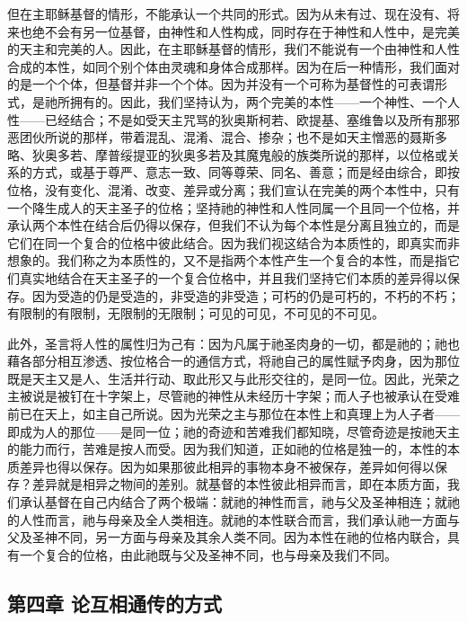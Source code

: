 但在主耶稣基督的情形，不能承认一个共同的形式。因为从未有过、现在没有、将来也绝不会有另一位基督，由神性和人性构成，同时存在于神性和人性中，是完美的天主和完美的人。因此，在主耶稣基督的情形，我们不能说有一个由神性和人性合成的本性，如同个别个体由灵魂和身体合成那样。因为在后一种情形，我们面对的是一个个体，但基督并非一个个体。因为并没有一个可称为基督性的可表谓形式，是祂所拥有的。因此，我们坚持认为，两个完美的本性——一个神性、一个人性——已经结合；不是如受天主咒骂的狄奥斯柯若、欧提基、塞维鲁以及所有那邪恶团伙所说的那样，带着混乱、混淆、混合、掺杂；也不是如天主憎恶的聂斯多略、狄奥多若、摩普绥提亚的狄奥多若及其魔鬼般的族类所说的那样，以位格或关系的方式，或基于尊严、意志一致、同等尊荣、同名、善意；而是经由综合，即按位格，没有变化、混淆、改变、差异或分离；我们宣认在完美的两个本性中，只有一个降生成人的天主圣子的位格；坚持祂的神性和人性同属一个且同一个位格，并承认两个本性在结合后仍得以保存，但我们不认为每个本性是分离且独立的，而是它们在同一个复合的位格中彼此结合。因为我们视这结合为本质性的，即真实而非想象的。我们称之为本质性的，又不是指两个本性产生一个复合的本性，而是指它们真实地结合在天主圣子的一个复合位格中，并且我们坚持它们本质的差异得以保存。因为受造的仍是受造的，非受造的非受造；可朽的仍是可朽的，不朽的不朽；有限制的有限制，无限制的无限制；可见的可见，不可见的不可见。\par

此外，圣言将人性的属性归为己有：因为凡属于祂圣肉身的一切，都是祂的；祂也藉各部分相互渗透、按位格合一的通信方式，将祂自己的属性赋予肉身，因为那位既是天主又是人、生活并行动、取此形又与此形交往的，是同一位。因此，光荣之主被说是被钉在十字架上，尽管祂的神性从未经历十字架；而人子也被承认在受难前已在天上，如主自己所说。因为光荣之主与那位在本性上和真理上为人子者——即成为人的那位——是同一位；祂的奇迹和苦难我们都知晓，尽管奇迹是按祂天主的能力而行，苦难是按人而受。因为我们知道，正如祂的位格是独一的，本性的本质差异也得以保存。因为如果那彼此相异的事物本身不被保存，差异如何得以保存？差异就是相异之物间的差别。就基督的本性彼此相异而言，即在本质方面，我们承认基督在自己内结合了两个极端：就祂的神性而言，祂与父及圣神相连；就祂的人性而言，祂与母亲及全人类相连。就祂的本性联合而言，我们承认祂一方面与父及圣神不同，另一方面与母亲及其余人类不同。因为本性在祂的位格内联合，具有一个复合的位格，由此祂既与父及圣神不同，也与母亲及我们不同。\par


\subsection{第四章 论互相通传的方式}

